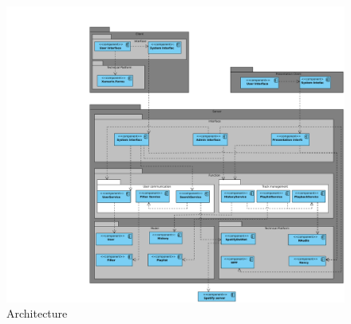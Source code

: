 \label{sec:architecture}

\begin{figure}
  \centering
  \includegraphics[width=1\linewidth]{Images/Arkitektur.pdf}
  \caption{Architecture}
  \label{fig:architecture}
\end{figure}
	
